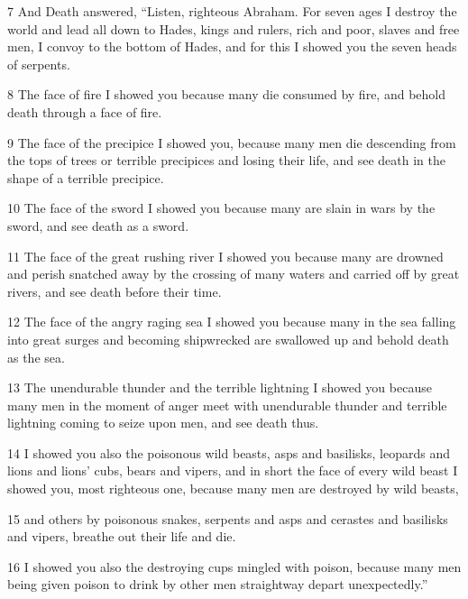 \par 7  And Death answered, “Listen, righteous Abraham. For seven ages I destroy the world and lead all down to Hades, kings and rulers, rich and poor, slaves and free men, I convoy to the bottom of Hades, and for this I showed you the seven heads of serpents. 

\par 8 The face of fire I showed you because many die consumed by fire, and behold death through a face of fire. 

\par 9 The face of the precipice I showed you, because many men die descending from the tops of trees or terrible precipices and losing their life, and see death in the shape of a terrible precipice. 

\par 10 The face of the sword I showed you because many are slain in wars by the sword, and see death as a sword. 

\par 11 The face of the great rushing river I showed you because many are drowned and perish snatched away by the crossing of many waters and carried off by great rivers, and see death before their time. 

\par 12 The face of the angry raging sea I showed you because many in the sea falling into great surges and becoming shipwrecked are swallowed up and behold death as the sea. 

\par 13 The unendurable thunder and the terrible lightning I showed you because many men in the moment of anger meet with unendurable thunder and terrible lightning coming to seize upon men, and see death thus. 

\par 14 I showed you also the poisonous wild beasts, asps and basilisks, leopards and lions and lions' cubs, bears and vipers, and in short the face of every wild beast I showed you, most righteous one, because many men are destroyed by wild beasts, 

\par 15 and others by poisonous snakes, serpents and asps and cerastes and basilisks and vipers, breathe out their life and die. 

\par 16 I showed you also the destroying cups mingled with poison, because many men being given poison to drink by other men straightway depart unexpectedly.”

